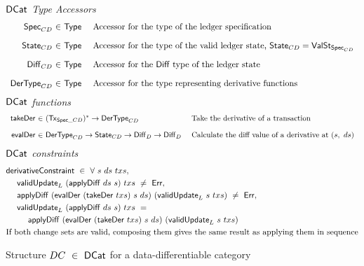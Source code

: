 \begin{figure*}[htb]
  \emph{$\mathsf{DCat}$ Type Accessors}
  \begin{equation*}
    \begin{array}{r@{~\in~}l@{~~~~}lr}
      \type{Spec}_{CD}
      & \Type
      & \text{Accessor for the type of the ledger specification}
      \nextdef
      \type{State}_{CD}
      & \Type
      & \text{Accessor for the type of the valid ledger state, $\type{State}_{CD} = \type{ValSt}_{\type{Spec}_{CD}}$}
      \nextdef
      \type{Diff}_{CD}
      & \Type
      & \text{Accessor for the $\Diff$ type of the ledger state}
      \nextdef
      \type{DerType}_{CD}
      & \Type
      & \text{Accessor for the type representing derivative functions}
    \end{array}
  \end{equation*}
  \emph{$\mathsf{DCat}$ functions}
  \begin{equation*}
    \begin{array}{r@{~\in~}l@{~~~~}lr}
      \fun{takeDer} & \seqof{(\type{Tx}_{\type{Spec}\_{CD}})} \to \type{DerType}_{CD} &
      \text{Take the derivative of a transaction}
      \nextdef
      \fun{evalDer} & \type{DerType}_{CD} \to \type{State}_{CD} \to \Diff_D \to \Diff_D &
      \text{Calculate the diff value of a derivative at $(s,~ds)$}
    \end{array}
  \end{equation*}
  \emph{$\mathsf{DCat}$ constraints}
  \begin{align*}
      &\mathsf{derivativeConstraint} ~\in~ \forall~s~ds~txs,\\
      &~~~~\mathsf{validUpdate}_L ~(\mathsf{applyDiff}~ ds~ s) ~txs~\neq~\mathsf{Err}, \\
      &~~~~\mathsf{applyDiff} ~(\mathsf{evalDer} ~(\mathsf{takeDer}~ txs) ~s~ ds)~ (\mathsf{validUpdate}_L~ s ~txs)~\neq~\mathsf{Err}, \\
      &~~~~\mathsf{validUpdate}_L ~(\mathsf{applyDiff}~ ds~ s) ~txs ~= \\
      &~~~~~~~~ \mathsf{applyDiff} ~(\mathsf{evalDer} ~(\mathsf{takeDer}~ txs) ~s~ ds)~ (\mathsf{validUpdate}_L~ s ~txs) \\
      & \text{If both change sets are valid, composing them gives the same result as applying them in sequence}
  \end{align*}
  \caption{Structure $DC~\in~\mathsf{DCat}$ for a data-differentiable category }
  \label{fig:diff-cat}
\end{figure*}


